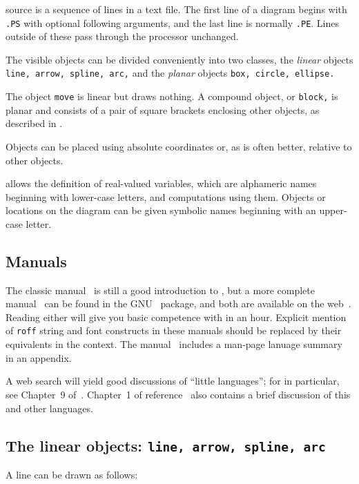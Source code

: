 
\Pic source is a sequence of lines in a text file.
The first line of a diagram begins with {\tt .PS} with optional following
arguments, and the last line is normally {\tt .PE}.
Lines outside of these pass through the \pic processor unchanged.

The visible objects can be divided conveniently into two classes, the
{\em linear} objects {\tt line, arrow, spline, arc,} and the
{\em planar} objects {\tt box, circle, ellipse.}

The object {\tt move} is linear but draws nothing.  A compound object,
or {\tt block,} is planar and consists of a pair of square brackets enclosing
other objects, as described in .

Objects can be placed using absolute coordinates or,
as is often better, relative to other objects.

\Pic allows the definition of real-valued variables, which are alphameric
names beginning with lower-case letters, and computations using them.
Objects or locations on the diagram can be given symbolic names
beginning with an upper-case letter.

\subsection{Manuals\label{Manuals:}}
The classic \pic manual~\cite{KRpic} is still a good introduction to \pic, but
a more complete manual~\cite{Raymond95} can be found in the GNU \groff\
package, and both are available on the web~\cite{KRpic,Raymond95}.  Reading
either will give you basic competence with \pic in an hour.  Explicit mention
of {\tt *roff} string and font constructs in these manuals should be replaced by
their equivalents in the \latex context.
The \dpic manual~\cite{Aplevich2022} includes a man-page lanuage
summary in an appendix.

A web search will yield good discussions of ``little languages'';
for \pic in particular, see Chapter~9 of~\cite{Bentley88}.
Chapter~1 of reference~\cite{Goossens97} also contains a brief
discussion of this and other languages.

\subsection{The linear objects: {\tt line, arrow, spline, arc}%
\label{Linearobjects:}}
A line can be drawn as follows:

